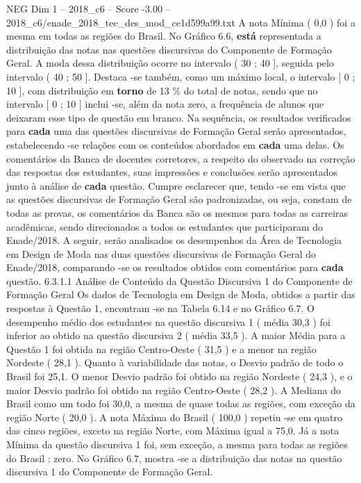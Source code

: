 \begin{textsample}{NEG Dim 1 – 2018\_c6 – Score -3.00 – 2018\_c6/enade\_2018\_tec\_des\_mod\_ce1d599a99.txt}
A nota Mínima ( 0,0 ) foi a mesma em todas as regiões do Brasil.
No Gráfico 6.6, \textbf{está} representada a distribuição das notas nas questões discursivas do Componente de Formação Geral.
A moda dessa distribuição ocorre no intervalo ( 30 ; 40 ], seguida pelo intervalo ( 40 ; 50 ].
Destaca -se também, como um máximo local, o intervalo [ 0 ; 10 ], com distribuição em \textbf{torno} de 13 \% do total de notas, sendo que no intervalo [ 0 ; 10 ] inclui -se, além da nota zero, a frequência de alunos que deixaram esse tipo de questão em branco.
Na sequência, os resultados verificados para \textbf{cada} uma das questões discursivas de Formação Geral serão apresentados, estabelecendo -se relações com os conteúdos abordados em \textbf{cada} uma delas.
Os comentários da Banca de docentes corretores, a respeito do observado na correção das respostas dos estudantes, suas impressões e conclusões serão apresentados junto à análise de \textbf{cada} questão.
Cumpre esclarecer que, tendo -se em vista que as questões discursivas de Formação Geral são padronizadas, ou seja, constam de todas as provas, os comentários da Banca são os mesmos para todas as carreiras acadêmicas, sendo direcionados a todos os estudantes que participaram do Enade/2018.
A seguir, serão analisados os desempenhos da Área de Tecnologia em Design de Moda nas duas questões discursivas de Formação Geral do Enade/2018, comparando -se os resultados obtidos com comentários para \textbf{cada} questão. 6.3.1.1 Análise de Conteúdo da Questão Discursiva 1 do Componente de Formação Geral Os dados de Tecnologia em Design de Moda, obtidos a partir das respostas à Questão 1, encontram -se na Tabela 6.14 e no Gráfico 6.7.
O desempenho médio dos estudantes na questão discursiva 1 ( média 30,3 ) foi inferior ao obtido na questão discursiva 2 ( média 33,5 ).
A maior Média para a Questão 1 foi obtida na região Centro-Oeste ( 31,5 ) e a menor na região Nordeste ( 28,1 ).
Quanto à variabilidade das notas, o Desvio padrão de todo o Brasil foi 25,1.
O menor Desvio padrão foi obtido na região Nordeste ( 24,3 ), e o maior Desvio padrão foi obtido na região Centro-Oeste ( 28,2 ).
A Mediana do Brasil como um todo foi 30,0, a mesma de quase todas as regiões, com exceção da região Norte ( 20,0 ).
A nota Máxima do Brasil ( 100,0 ) repetiu -se em quatro das cinco regiões, exceto na região Norte, com Máxima igual a 75,0.
Já a nota Mínima da questão discursiva 1 foi, sem exceção, a mesma para todas as regiões do Brasil : zero.
No Gráfico 6.7, mostra -se a distribuição das notas na questão discursiva 1 do Componente de Formação Geral.

\end{textsample}
